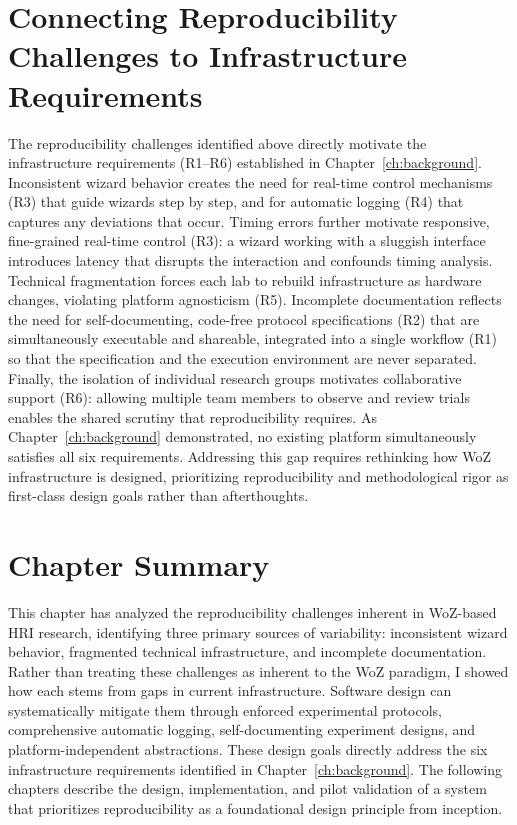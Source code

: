\section{Connecting Reproducibility Challenges to Infrastructure Requirements}

The reproducibility challenges identified above directly motivate the infrastructure requirements (R1--R6) established in Chapter~\ref{ch:background}. Inconsistent wizard behavior creates the need for real-time control mechanisms (R3) that guide wizards step by step, and for automatic logging (R4) that captures any deviations that occur. Timing errors further motivate responsive, fine-grained real-time control (R3): a wizard working with a sluggish interface introduces latency that disrupts the interaction and confounds timing analysis. Technical fragmentation forces each lab to rebuild infrastructure as hardware changes, violating platform agnosticism (R5). Incomplete documentation reflects the need for self-documenting, code-free protocol specifications (R2) that are simultaneously executable and shareable, integrated into a single workflow (R1) so that the specification and the execution environment are never separated. Finally, the isolation of individual research groups motivates collaborative support (R6): allowing multiple team members to observe and review trials enables the shared scrutiny that reproducibility requires. As Chapter~\ref{ch:background} demonstrated, no existing platform simultaneously satisfies all six requirements. Addressing this gap requires rethinking how WoZ infrastructure is designed, prioritizing reproducibility and methodological rigor as first-class design goals rather than afterthoughts.

\section{Chapter Summary}

This chapter has analyzed the reproducibility challenges inherent in WoZ-based HRI research, identifying three primary sources of variability: inconsistent wizard behavior, fragmented technical infrastructure, and incomplete documentation. Rather than treating these challenges as inherent to the WoZ paradigm, I showed how each stems from gaps in current infrastructure. Software design can systematically mitigate them through enforced experimental protocols, comprehensive automatic logging, self-documenting experiment designs, and platform-independent abstractions. These design goals directly address the six infrastructure requirements identified in Chapter~\ref{ch:background}. The following chapters describe the design, implementation, and pilot validation of a system that prioritizes reproducibility as a foundational design principle from inception.
